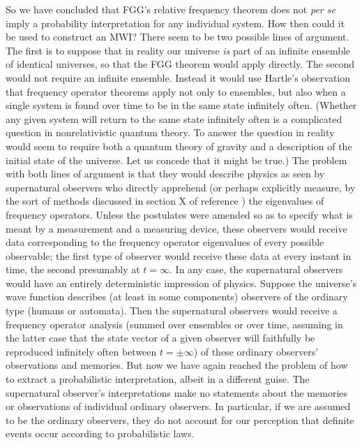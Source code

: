 \documentclass[aps,pra,12pt]{revtex4}
\begin{document}
So we have concluded that FGG's relative frequency theorem 
does not {\em per se} imply a probability interpretation 
for any individual system.  How then could it be 
used to construct an MWI?  There seem to be 
two possible lines of argument.  The first is to 
suppose that in reality our universe {\em is} part 
of an infinite ensemble of identical universes, so that 
the FGG theorem would apply directly.  The second would 
not require an infinite ensemble.  Instead it would use 
Hartle's observation\cite{har} that frequency operator theorems apply not only 
to ensembles, but also when a single system is 
found over time to be in the same state 
infinitely often.  (Whether any given system will return to 
the same state infinitely often is a complicated question 
in nonrelativistic quantum theory.  To answer the question in 
reality would seem to require both a quantum theory 
of gravity and a description of the initial state 
of the universe.  Let us concede that it might 
be true.)  The problem with both lines of argument 
is that they would describe physics as seen by 
supernatural observers who directly apprehend (or perhaps explicitly measure,
by the sort of methods discussed in section X 
of reference \cite{fgg}) the eigenvalues of frequency operators.
Unless the postulates were amended so as to specify 
what is meant by a measurement and a measuring 
device, these observers would receive data corresponding to the 
frequency operator eigenvalues of every possible observable; the first 
type of observer would receive these data at every 
instant in time, the second presumably at $t= \infty$.  In 
any case, the supernatural observers would have an 
entirely deterministic impression of physics.  Suppose the universe's wave 
function describes (at least in some components) observers of 
the ordinary type (humans or automata).  Then the supernatural 
observers would receive a frequency operator analysis (summed over 
ensembles or over time, assuming in the latter case 
that the state vector of a given observer will 
faithfully be reproduced infinitely often 
between $t = \pm \infty$) of these 
ordinary observers' observations and memories.  But now 
we have again reached the problem of how to 
extract a probabilistic interpretation, albeit in a different guise.
The supernatural observer's interpretations make no statements about the 
memories or observations of individual ordinary observers.  In particular,
if we are assumed to be the ordinary observers,
they do not account for our perception that definite 
events occur according to probabilistic laws.  
\end{document}
